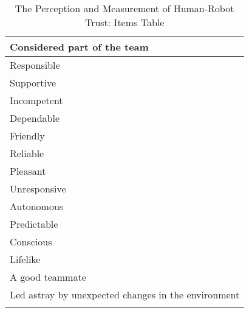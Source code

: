 \begin{longtable}{l}
    Considered part of the team \\ \hline
    Responsible \\ \hline
    Supportive \\ \hline
    Incompetent \\ \hline
    Dependable \\ \hline
    Friendly \\ \hline
    Reliable \\ \hline
    Pleasant \\ \hline
    Unresponsive \\ \hline
    Autonomous \\ \hline
    Predictable \\ \hline
    Conscious \\ \hline
    Lifelike \\ \hline
    A good teammate \\ \hline
    Led astray by unexpected changes in the environment \\
    \caption{The Perception and Measurement of Human-Robot Trust: Items Table}
    \label{tbl:measurement.items.table}	
\end{longtable}
